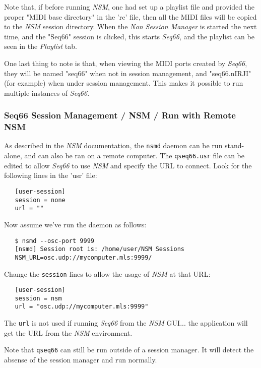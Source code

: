   Note that, if before running \textsl{NSM},
   one had set up a playlist file and provided the proper "MIDI
   base directory" in the 'rc' file, then all the MIDI files will be copied to
   the \textsl{NSM} session directory.
   When the \textsl{Non Session Manager} is started the next time, and the
   "Seq66" session is clicked, this starts \textsl{Seq66}, and the playlist can
   be seen in the \textsl{Playlist} tab.

   One last thing to note is that, when viewing the MIDI ports created by
   \textsl{Seq66}, they will be named "seq66" when not in session management,
   and "seq66.nIRJI" (for example) when under session management.  This makes
   it possible to run multiple instances of \textsl{Seq66}.

\subsubsection{Seq66 Session Management / NSM / Run with Remote NSM}
\label{subsec:sessions_nsm_before_using_nsm}

   As described in the \textsl{NSM} documentation, the \texttt{nsmd} daemon can
   be run stand-alone, and can also be ran on a remote computer.
   The \texttt{qseq66.usr} file can be edited to allow \textsl{Seq66} to
   use \textsl{NSM} and specify the URL to connect.
   Look for the following lines in the 'usr' file:

\begin{verbatim}
   [user-session]
   session = none
   url = ""
\end{verbatim}

   Now assume we've run the daemon as follows:

\begin{verbatim}
   $ nsmd --osc-port 9999
   [nsmd] Session root is: /home/user/NSM Sessions
   NSM_URL=osc.udp://mycomputer.mls:9999/
\end{verbatim}

   Change the \texttt{session} lines to allow the usage of
   \textsl{NSM} at that URL:

\begin{verbatim}
   [user-session]
   session = nsm
   url = "osc.udp://mycomputer.mls:9999"
\end{verbatim}

   The \texttt{url} is not used if running \textsl{Seq66} from the \textsl{NSM}
   GUI... the application will get the URL from the \textsl{NSM} environment.

   Note that \texttt{qseq66} can still be run outside of a
   session manager.  It will detect the absense of the session manager and run
   normally.

